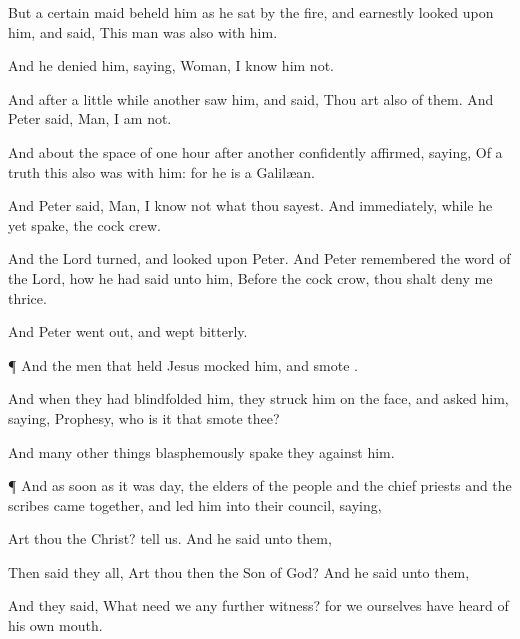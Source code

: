 {But a
certain
maid
beheld
him as he
sat
by the
fire,
and earnestly
looked upon
him, and
said, This
man
was
also
with
him.

And he
denied
him,
saying,
Woman, I
know
him
not.

And
after a little
while
another
saw
him,
and
said,
Thou art
also
of
them.
And
Peter
said,
Man, I
am
not.

And
about the
space of
one
hour
after
another confidently
affirmed,
saying,
Of a
truth
this
{}
also
was
with
him:
for he
is a
Galilæan.

And
Peter
said,
Man, I
know
not
what thou
sayest.
And
immediately, while
he
yet
spake, the
cock
crew.

And the
Lord
turned, and
looked upon
Peter.
And
Peter
remembered the
word of the
Lord,
how he had
said unto
him,
Before the
cock
crow, thou shalt
deny
me
thrice.

And
Peter
went
out, and
wept
bitterly.


\par }{\PP {}¶
And the
men
that
held
Jesus
mocked
him, and
smote
{}.

And when they had
blindfolded
him, they
struck
him on the
face,
and
asked
him,
saying,
Prophesy,
who is
it
that
smote
thee?

And
many other
things
blasphemously spake
they
against
him.


\par }{\PP {}¶
And as soon
as it
was
day, the
elders of the
people
and the chief
priests
and the
scribes came
together,
and
led
him
into
their
council,
saying,

Art
thou the
Christ?
tell
us.
And he
said unto
them,
{}



Then said
they
all,
Art
thou
then the
Son of
God?
And he
said
unto
them,
{}

And they
said,
What
need we
any
further
witness?
for we
ourselves have
heard
of his
own
mouth.




\par }

